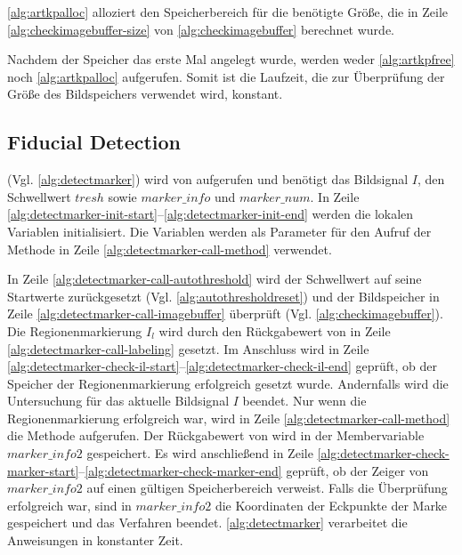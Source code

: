 \autoref{alg:artkpalloc} alloziert den Speicherbereich für die benötigte Größe, die in Zeile
 \ref{alg:checkimagebuffer-size} von \autoref{alg:checkimagebuffer} berechnet wurde.



Nachdem der Speicher das erste Mal angelegt wurde, werden weder \autoref{alg:artkpfree} noch \autoref{alg:artkpalloc}
 aufgerufen. Somit ist die Laufzeit, die zur Überprüfung der Größe des Bildspeichers verwendet wird, konstant.



\subsection{Fiducial Detection} %
\label{sec:fiducial_detection}

 (Vgl. \autoref{alg:detectmarker}) wird von  aufgerufen und benötigt das
 Bildsignal $I$, den Schwellwert $\mathit{tresh}$ sowie $\mathit{marker\_info}$ und $\mathit{marker\_num}$. In Zeile
 \ref{alg:detectmarker-init-start}--\ref{alg:detectmarker-init-end} werden die lokalen Variablen initialisiert. Die
 Variablen werden als Parameter für den Aufruf der Methode  in Zeile
 \ref{alg:detectmarker-call-method} verwendet.



In Zeile \ref{alg:detectmarker-call-autothreshold} wird der Schwellwert auf seine Startwerte zurückgesetzt
 (Vgl. \autoref{alg:autothresholdreset}) und der Bildspeicher in Zeile \ref{alg:detectmarker-call-imagebuffer}
 überprüft (Vgl. \autoref{alg:checkimagebuffer}). Die Regionenmarkierung $I_l$ wird durch den Rückgabewert von
  in Zeile \ref{alg:detectmarker-call-labeling} gesetzt. Im Anschluss wird in Zeile
 \ref{alg:detectmarker-check-il-start}--\ref{alg:detectmarker-check-il-end} geprüft, ob der Speicher der
 Regionenmarkierung erfolgreich gesetzt wurde. Andernfalls wird die Untersuchung für das aktuelle Bildsignal $I$
 beendet. Nur wenn die Regionenmarkierung erfolgreich war, wird in Zeile \ref{alg:detectmarker-call-method} die Methode
  aufgerufen. Der Rückgabewert von  wird in der Membervariable
 $\mathit{marker\_info2}$ gespeichert. Es wird anschließend in Zeile
 \ref{alg:detectmarker-check-marker-start}--\ref{alg:detectmarker-check-marker-end} geprüft, ob der Zeiger von
 $\mathit{marker\_info2}$ auf einen gültigen Speicherbereich verweist. Falls die Überprüfung erfolgreich war, sind in
 $\mathit{marker\_info2}$ die Koordinaten der Eckpunkte der Marke gespeichert und das Verfahren beendet.
 \autoref{alg:detectmarker} verarbeitet die Anweisungen in konstanter Zeit.

